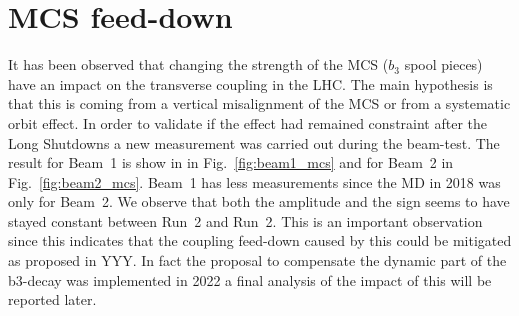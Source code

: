 \documentclass[a4paper]{cernatsnote}
\begin{document}
\section{MCS feed-down}
It has been observed that changing the strength of the MCS ($b_3$ spool pieces) have an impact on the transverse coupling in the LHC. The main hypothesis is that this is coming from a vertical misalignment of the MCS or from a systematic orbit effect. In order to validate if the effect had remained constraint after the Long Shutdowns a new measurement was carried out during the beam-test. The result for Beam~1 is show in in Fig.~\ref{fig:beam1_mcs} and for Beam~2 in  Fig.~\ref{fig:beam2_mcs}. Beam~1 has less measurements since the MD in 2018 was only for Beam~2. We observe that both the amplitude and the sign seems to have stayed constant between Run~2 and Run~2. This is an important observation since this indicates that the coupling feed-down caused by this could be mitigated as proposed in YYY. In fact the proposal to compensate the dynamic part of the b3-decay was implemented in 2022 a final analysis of the impact of this will be reported later.
\end{document}
